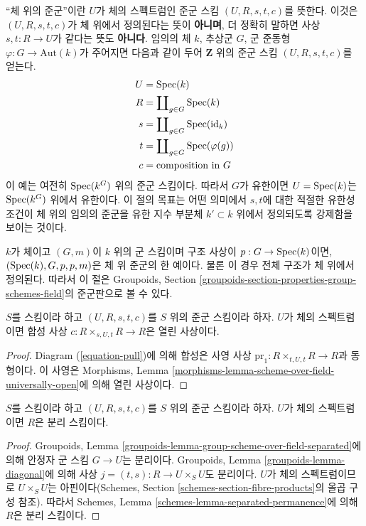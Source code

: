 \noindent
``체 위의 준군''이란 $U$가 체의 스펙트럼인 준군 스킴
$(U, R, s, t, c)$를 뜻한다. 이것은 $(U, R, s, t, c)$가 체 위에서
정의된다는 뜻이 {\bf 아니며}, 더 정확히 말하면 사상
$s, t : R \to U$가 같다는 뜻도 {\bf 아니다}.
임의의 체 $k$, 추상군 $G$, 군 준동형
$\varphi : G \to \text{Aut}(k)$가 주어지면 다음과 같이 두어
$\mathbf{Z}$ 위의 준군 스킴 $(U, R, s, t, c)$를 얻는다.
\begin{align*}
U & = \mathop{\mathrm{Spec}}(k) \\
R & = \coprod\nolimits_{g \in G} \mathop{\mathrm{Spec}}(k) \\
s & = \coprod\nolimits_{g \in G} \mathop{\mathrm{Spec}}(\text{id}_k) \\
t & = \coprod\nolimits_{g \in G} \mathop{\mathrm{Spec}}(\varphi(g)) \\
c & = \text{composition in }G
\end{align*}
이 예는 여전히 $\mathop{\mathrm{Spec}}(k^G)$ 위의 준군 스킴이다. 따라서 $G$가 유한이면
$U = \mathop{\mathrm{Spec}}(k)$는 $\mathop{\mathrm{Spec}}(k^G)$ 위에서 유한이다. 이 절의 목표는 어떤 의미에서
$s, t$에 대한 적절한 유한성 조건이 체 위의 임의의 준군을 유한 지수 부분체
$k' \subset k$ 위에서 정의되도록 강제함을 보이는 것이다.

\medskip\noindent
$k$가 체이고 $(G, m)$이 $k$ 위의 군 스킴이며 구조 사상이
$p : G \to \mathop{\mathrm{Spec}}(k)$이면, $(\mathop{\mathrm{Spec}}(k), G, p, p, m)$은 체 위 준군의 한 예이다.
물론 이 경우 전체 구조가 체 위에서 정의된다. 따라서 이 절은
Groupoids, Section \ref{groupoids-section-properties-group-schemes-field}의
준군판으로 볼 수 있다.

\begin{lemma}
\label{lemma-groupoid-on-field-open-multiplication}
$S$를 스킴이라 하고 $(U, R, s, t, c)$를 $S$ 위의 준군 스킴이라 하자.
$U$가 체의 스펙트럼이면 합성 사상
$c : R \times_{s, U, t} R \to R$은 열린 사상이다.
\end{lemma}

\begin{proof}
Diagram (\ref{equation-pull})에 의해 합성은 사영 사상
$\text{pr}_1 : R \times_{t, U, t} R \to R$과 동형이다.
이 사영은 Morphisms, Lemma
\ref{morphisms-lemma-scheme-over-field-universally-open}에 의해 열린 사상이다.
\end{proof}

\begin{lemma}
\label{lemma-groupoid-on-field-separated}
$S$를 스킴이라 하고 $(U, R, s, t, c)$를 $S$ 위의 준군 스킴이라 하자.
$U$가 체의 스펙트럼이면 $R$은 분리 스킴이다.
\end{lemma}

\begin{proof}
Groupoids, Lemma \ref{groupoids-lemma-group-scheme-over-field-separated}에 의해
안정자 군 스킴 $G \to U$는 분리이다. Groupoids, Lemma
\ref{groupoids-lemma-diagonal}에 의해 사상
$j = (t, s) : R \to U \times_S U$도 분리이다. $U$가 체의 스펙트럼이므로
$U \times_S U$는 아핀이다(Schemes, Section
\ref{schemes-section-fibre-products}의 올곱 구성 참조). 따라서 Schemes, Lemma
\ref{schemes-lemma-separated-permanence}에 의해 $R$은 분리 스킴이다.
\end{proof}

